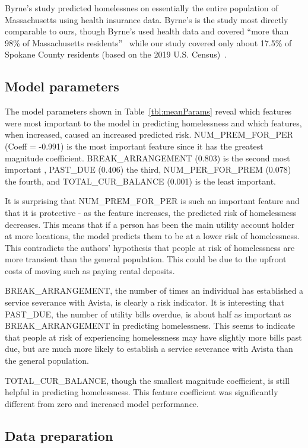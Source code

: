 \documentclass[10pt,letterpaper]{article}
\begin{document}
Byrne's study predicted homelessnes on essentially the entire population of Massachusetts using health insurance data. Byrne's is the study most directly comparable to ours, though Byrne's used health data and covered ``more than 98\% of Massachusetts residents''~\cite{byrne2020classification} while our study covered only about 17.5\% of Spokane County residents (based on the 2019 U.S. Census)~\cite{SpokanePop}.

\subsection*{Model parameters}
The model parameters shown in Table~\ref{tbl:meanParams} reveal which features were most important to the model in predicting homelessness and which features, when increased, caused an increased predicted risk. NUM\_PREM\_FOR\_PER (Coeff = -0.991) is the most important feature since it has the greatest magnitude coefficient. BREAK\_ARRANGEMENT (0.803) is the second most important , PAST\_DUE (0.406) the third, NUM\_PER\_FOR\_PREM (0.078) the fourth, and TOTAL\_CUR\_BALANCE (0.001) is the least important.

It is surprising that NUM\_PREM\_FOR\_PER is such an important feature and that it is protective - as the feature increases, the predicted risk of homelessness decreases. This means that if a person has been the main utility account holder at more locations, the model predicts them to be at a lower risk of homelessness. This contradicts the authors' hypothesis that people at risk of homelessness are more transient than the general population. This could be due to the upfront costs of moving such as paying rental deposits.

BREAK\_ARRANGEMENT, the number of times an individual has established a service severance with Avista, is clearly a risk indicator. It is interesting that PAST\_DUE, the number of utility bills overdue, is about half as important as BREAK\_ARRANGEMENT in predicting homelessness. This seems to indicate that people at risk of experiencing homelessness may have slightly more bills past due, but are much more likely to establish a service severance with Avista than the general population. 

TOTAL\_CUR\_BALANCE, though the smallest magnitude coefficient, is still helpful in predicting homelessness. This feature coefficient was significantly different from zero and increased model performance.

\subsection*{Data preparation}
\end{document}
